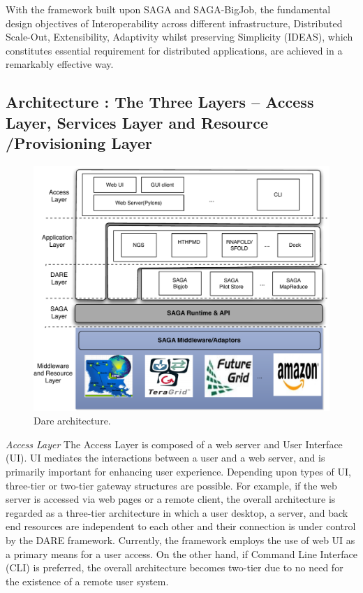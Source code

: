 \documentclass{sig-alternate}
\begin{document}
With the framework built upon SAGA and SAGA-BigJob, the fundamental design objectives of Interoperability across different infrastructure, Distributed Scale-Out, Extensibility, Adaptivity whilst preserving Simplicity (IDEAS), which constitutes essential requirement for distributed applications, are achieved in a remarkably effective way\cite{ideas}.



\subsection{Architecture : The Three Layers -- Access Layer, Services Layer and Resource /Provisioning Layer}

\begin{figure}
 \centering
\includegraphics[scale=0.40]{figures/DAREOutline.pdf}

\caption{\small Dare architecture.}
  \label{fig:dare-arch} 
\end{figure}

 

%


\textit{Access Layer}  The Access Layer is composed of a web server and User Interface (UI).  UI mediates the interactions between a user and a web server, and is primarily important for enhancing user experience.  Depending upon types of UI, three-tier or two-tier gateway structures are possible.  For example, if the web server is accessed via web pages or a remote client, the overall architecture is regarded as a three-tier architecture in which a user desktop, a server, and back end resources are independent to each other and their connection is under control by the DARE framework.  Currently, the framework employs the use of web UI as a primary means for a user access.  On the other hand, if Command Line Interface (CLI) is preferred, the overall architecture becomes two-tier due to no need for the existence of a remote user system.  
\end{document}
